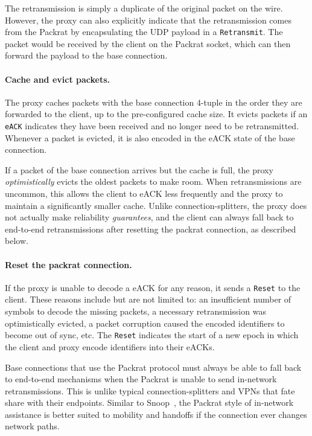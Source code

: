The retransmission is simply a duplicate of the original packet on the wire.
However, the proxy can also explicitly indicate that the retransmission comes
from the Packrat by encapsulating the UDP payload in a \texttt{Retransmit}. The
packet would be received by the client on the Packrat socket, which can then forward
the payload to the base connection.

\paragraph{Cache and evict packets.}

The proxy caches packets with the base connection 4-tuple in the order they are
forwarded to the client, up to the pre-configured cache size. It evicts packets
if an \texttt{eACK} indicates they have been received and no longer need to be
retransmitted. Whenever a packet is evicted, it is also encoded in the eACK
state of the base connection.

If a packet of the base connection arrives but the cache is full, the
proxy \textit{optimistically} evicts the oldest packets to make room. When
retransmissions are uncommon, this allows the client to eACK less frequently
and the proxy to maintain a significantly smaller cache. Unlike
connection-splitters, the proxy does not actually make reliability \textit
{guarantees}, and the client can always fall back to end-to-end retransmissions
after resetting the packrat connection, as described below.

\paragraph{Reset the packrat connection.}

If the proxy is unable to decode a eACK for any reason, it sends a \texttt
{Reset} to the client. These reasons include but are not limited to: an
insufficient number of symbols to decode the missing packets, a necessary
retransmission was optimistically evicted,
a packet corruption caused the encoded identifiers
to become out of sync, etc. The \texttt{Reset} indicates the start of a new
epoch in which the client and proxy encode identifiers into their eACKs.

Base connections that use the Packrat protocol must always be able to fall back to
end-to-end mechanisms when the Packrat is unable to send in-network
retransmissions. This is unlike typical connection-splitters and VPNs that fate
share with their endpoints. Similar to Snoop~\cite{balakrishnan1995snoop},
the Packrat style of in-network
assistance is better suited to mobility and handoffs if the connection ever
changes network paths.


